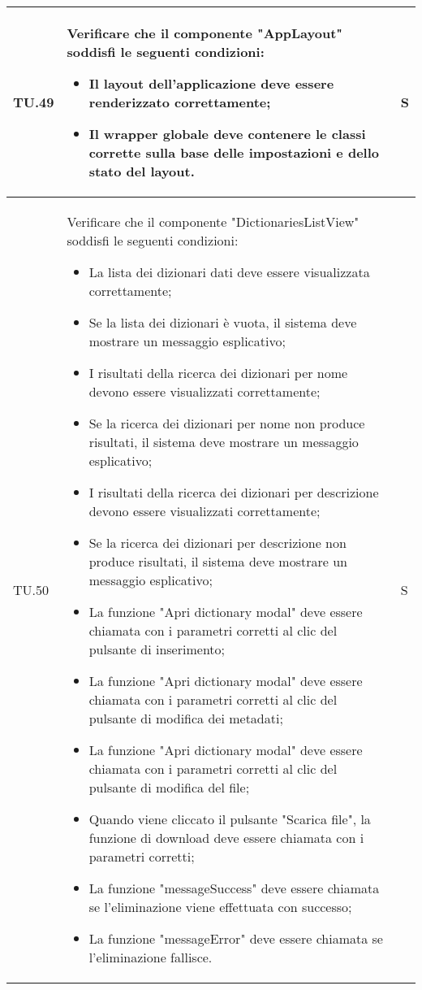 \begin{adjustwidth}{-0.5cm}{-0.5cm}
\begin{longtable}{|P{1.5cm}|>{\raggedright}P{9.5cm}|>{\arraybackslash}P{1.5cm}|}
		\hline TU.49 & Verificare che il componente "AppLayout" soddisfi le seguenti condizioni:
    \begin{itemize}
      \item Il layout dell'applicazione deve essere renderizzato correttamente;
      \item Il wrapper globale deve contenere le classi corrette sulla base delle impostazioni e dello stato del layout.
    \end{itemize} & S \\

		\hline TU.50 & Verificare che il componente "DictionariesListView" soddisfi le seguenti condizioni:
    \begin{itemize}
      \item La lista dei dizionari dati deve essere visualizzata correttamente;
			\item Se la lista dei dizionari è vuota, il sistema deve mostrare un messaggio esplicativo;
			\item I risultati della ricerca dei dizionari per nome devono essere visualizzati correttamente;
			\item Se la ricerca dei dizionari per nome non produce risultati, il sistema deve mostrare un messaggio esplicativo;
			\item I risultati della ricerca dei dizionari per descrizione devono essere visualizzati correttamente;
			\item Se la ricerca dei dizionari per descrizione non produce risultati, il sistema deve mostrare un messaggio esplicativo;
			\item La funzione "Apri dictionary modal" deve essere chiamata con i parametri corretti al clic del pulsante di inserimento;
			\item La funzione "Apri dictionary modal" deve essere chiamata con i parametri corretti al clic del pulsante di modifica dei metadati;
			\item La funzione "Apri dictionary modal" deve essere chiamata con i parametri corretti al clic del pulsante di modifica del file;
			\item Quando viene cliccato il pulsante "Scarica file", la funzione di download deve essere chiamata con i parametri corretti;
			\item La funzione "messageSuccess" deve essere chiamata se l'eliminazione viene effettuata con successo;
			\item La funzione "messageError" deve essere chiamata se l'eliminazione fallisce.
    \end{itemize} & S \\


\end{longtable}
\end{adjustwidth}
